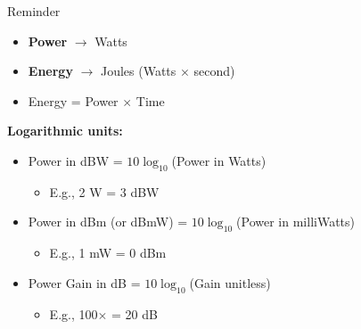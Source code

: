 \documentclass[aspectratio=169,11pt]{beamer}
\begin{document}
\begin{frame}{Reminder}
    \begin{itemize}
        \item \textbf{Power} $\rightarrow$ Watts
        \item \textbf{Energy} $\rightarrow$ Joules (Watts $\times$ second)
        \item Energy = Power $\times$ Time
    \end{itemize}
    
    \vspace{0.3cm}
    \textbf{Logarithmic units:}
    \begin{itemize}
        \item Power in dBW = $10\log_{10}$(Power in Watts)
        \begin{itemize}
            \item E.g., 2 W = 3 dBW
        \end{itemize}
        \item Power in dBm (or dBmW) = $10\log_{10}$(Power in milliWatts)
        \begin{itemize}
            \item E.g., 1 mW = 0 dBm
        \end{itemize}
        \item Power Gain in dB = $10\log_{10}$(Gain unitless)
        \begin{itemize}
            \item E.g., 100$\times$ = 20 dB
        \end{itemize}
    \end{itemize}
\end{frame}
\end{document}

